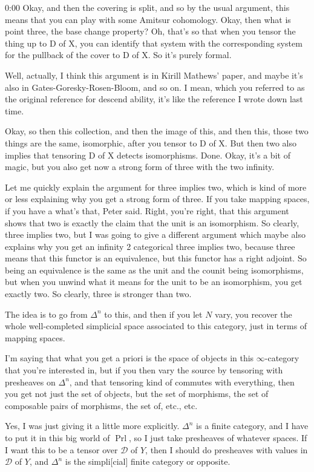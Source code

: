 \begin{unfinished}{0:00}
Okay, and then the covering is split, and so by the usual argument, this means that you can play with some Amitsur cohomology. Okay, then what is point three, the base change property? Oh, that's so that when you tensor the thing up to D of X, you can identify that system with the corresponding system for the pullback of the cover to D of X. So it's purely formal.

Well, actually, I think this argument is in Kirill Mathews' paper, and maybe it's also in Gates-Goresky-Rosen-Bloom, and so on. I mean, which you referred to as the original reference for descend ability, it's like the reference I wrote down last time.

Okay, so then this collection, and then the image of this, and then this, those two things are the same, isomorphic, after you tensor to D of X. But then two also implies that tensoring D of X detects isomorphisms. Done. Okay, it's a bit of magic, but you also get now a strong form of three with the two infinity.

Let me quickly explain the argument for three implies two, which is kind of more or less explaining why you get a strong form of three. If you take mapping spaces, if you have a what's that, Peter said. Right, you're right, that this argument shows that two is exactly the claim that the unit is an isomorphism. So clearly, three implies two, but I was going to give a different argument which maybe also explains why you get an infinity 2 categorical three implies two, because three means that this functor is an equivalence, but this functor has a right adjoint. So being an equivalence is the same as the unit and the counit being isomorphisms, but when you unwind what it means for the unit to be an isomorphism, you get exactly two. So clearly, three is stronger than two.

The idea is to go from $\Delta^n$ to this, and then if you let $N$ vary, you recover the whole well-completed simplicial space associated to this category, just in terms of mapping spaces.

I'm saying that what you get a priori is the space of objects in this $\infty$-category that you're interested in, but if you then vary the source by tensoring with presheaves on $\Delta^n$, and that tensoring kind of commutes with everything, then you get not just the set of objects, but the set of morphisms, the set of composable pairs of morphisms, the set of, etc., etc.

Yes, I was just giving it a little more explicitly. $\Delta^n$ is a finite category, and I have to put it in this big world of $\operatorname{Prl}$, so I just take presheaves of whatever spaces. If I want this to be a tensor over $\mathcal{D}$ of $Y$, then I should do presheaves with values in $\mathcal{D}$ of $Y$, and $\Delta^n$ is the simpli[cial] finite category or opposite.


\end{unfinished}
